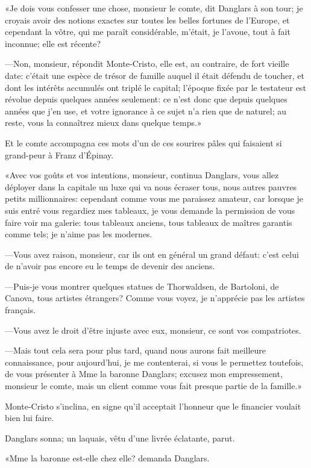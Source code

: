«Je dois vous confesser une chose, monsieur le comte, dit Danglars à son tour; je croyais avoir des notions exactes sur toutes les belles fortunes de l'Europe, et cependant la vôtre, qui me paraît considérable, m'était, je l'avoue, tout à fait inconnue; elle est récente? 

—Non, monsieur, répondit Monte-Cristo, elle est, au contraire, de fort vieille date: c'était une espèce de trésor de famille auquel il était défendu de toucher, et dont les intérêts accumulés ont triplé le capital; l'époque fixée par le testateur est révolue depuis quelques années seulement: ce n'est donc que depuis quelques années que j'en use, et votre ignorance à ce sujet n'a rien que de naturel; au reste, vous la connaîtrez mieux dans quelque temps.» 

Et le comte accompagna ces mots d'un de ces sourires pâles qui faisaient si grand-peur à Franz d'Épinay. 

«Avec vos goûts et vos intentions, monsieur, continua Danglars, vous allez déployer dans la capitale un luxe qui va nous écraser tous, nous autres pauvres petits millionnaires: cependant comme vous me paraissez amateur, car lorsque je suis entré vous regardiez mes tableaux, je vous demande la permission de vous faire voir ma galerie: tous tableaux anciens, tous tableaux de maîtres garantis comme tels; je n'aime pas les modernes. 

—Vous avez raison, monsieur, car ils ont en général un grand défaut: c'est celui de n'avoir pas encore eu le temps de devenir des anciens. 

—Puis-je vous montrer quelques statues de Thorwaldsen, de Bartoloni, de Canova, tous artistes étrangers? Comme vous voyez, je n'apprécie pas les artistes français. 

—Vous avez le droit d'être injuste avec eux, monsieur, ce sont vos compatriotes. 

—Mais tout cela sera pour plus tard, quand nous aurons fait meilleure connaissance, pour aujourd'hui, je me contenterai, si vous le permettez toutefois, de vous présenter à Mme la baronne Danglars; excusez mon empressement, monsieur le comte, mais un client comme vous fait presque partie de la famille.» 

Monte-Cristo s'inclina, en signe qu'il acceptait l'honneur que le financier voulait bien lui faire. 

Danglars sonna; un laquais, vêtu d'une livrée éclatante, parut. 

«Mme la baronne est-elle chez elle? demanda Danglars. 

